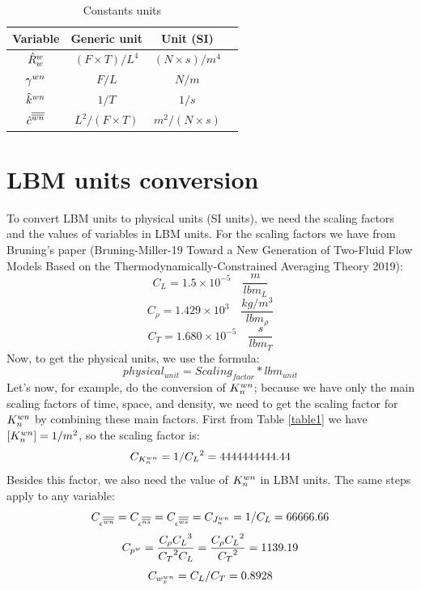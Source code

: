 \documentclass{article}
\begin{document}
 \begin{table}[h!]
\centering
 \begin{tabular}{ c c  c c} 
 \hline
Variable   & Generic unit &  Unit (SI) \\  [1ex]
 \hline
 \({{\hat{R}}}^w_w\)     &  \( (F\times T)/L^4 \)  & \( (N\times s)/m^4 \) \\
 \({{\gamma}^{{wn}}}\)     &  \(  F/L\)  & \(N/m \) \\ 
\({{\hat{k}}}^{wn}\)   &  \( 1/T \)  & \(1/s  \)  \\
\({\hat c}^{{\overline{\overline{{wn}}}}} \)  &  \( L^2/(F\times T)\)  & \( m^2/(N\times s)\)  \\[1ex] 
 \hline
 \end{tabular}
 \caption{Constants units}
\label{table3}
\end{table}
\pagebreak
\section{LBM units conversion}
To convert LBM units to physical units (SI units), we need the scaling factors and the values of variables in LBM units. For the scaling factors we have from Bruning's paper (Bruning-Miller-19 Toward a New Generation of Two-Fluid Flow Models Based on the Thermodynamically-Constrained Averaging Theory 2019):
\begin{equation}
C_L=1.5 \times 10^{-5} \quad \frac{m}{lbm_L}
\label{eq:C_L}
\end{equation}
\begin{equation}
C_{\rho}=1.429 \times 10^{3} \quad \frac{kg/m^3}{lbm_{\rho}}
\label{eq:C_rho}
\end{equation}
\begin{equation}
C_{T}=1.680\times 10^{-5} \quad \frac{s}{lbm_{T}}
\label{eq:C_T}
\end{equation}
Now, to get the physical units, we use the formula:
\begin{equation}
physical_{unit}=Scaling_{factor}*lbm_{unit}
\label{eq:scaling_lbm}
\end{equation}
Let's now, for example, do the conversion of \(K_n^{wn}\); because we have only the main scaling factors of time, space, and density, we need to get the scaling factor for \(K_n^{wn}\) by combining these main factors. First from Table \ref{table1}  we have \([K_n^{wn}]=1/m^2\), so the scaling factor is:
\begin{equation}
C_{K_n^{wn}}=1/{C_L}^2=4444444444.44
\label{eq:C_Kwn}
\end{equation}
Besides this factor, we also need the value of \(K_n^{wn}\) in LBM units. The same steps apply to any variable:
\begin{equation}
C_{{{{\epsilon}^{{\overline{\overline{{wn}}}}}}}}=C_{{{{\epsilon}^{{\overline{\overline{{ns}}}}}}}}=C_{{{{\epsilon}^{{\overline{\overline{{ws}}}}}}}}=C_{J_n^{wn}}=1/{C_L}=66666.66
\label{eq:C_ewn}
\end{equation}
\begin{equation}
C_{{{{p_{}^{w}}}}}=\frac{C_{\rho}{C_L}^3}{{C_T}^2C_L} =\frac{C_{\rho}{C_L}^2}{{C_T}^2}=1139.19
\label{eq:C_pw}
\end{equation}
\begin{equation}
C_{w_x^{wn}}={C_L}/{C_T}=0.8928
\label{eq:C_wxwn}
\end{equation}
\pagebreak
\end{document}
